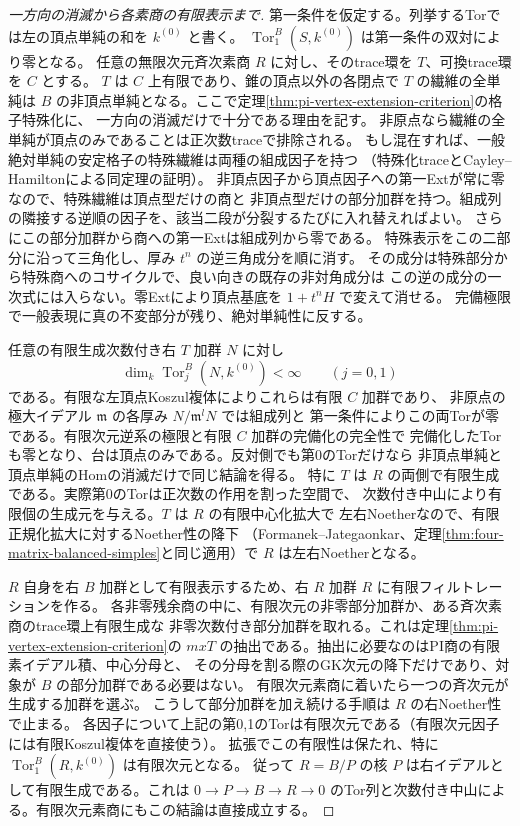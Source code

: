 \begin{proof}[一方向の消滅から各素商の有限表示まで]
第一条件を仮定する。列挙するTorでは左の頂点単純の和を $k^{(0)}$ と書く。
$\operatorname{Tor}_1^B(S,k^{(0)})$ は第一条件の双対により零となる。
任意の無限次元斉次素商 $R$ に対し、そのtrace環を $T$、可換trace環を $C$ とする。
$T$ は $C$ 上有限であり、錐の頂点以外の各閉点で $T$ の繊維の全単純は
$B$ の非頂点単純となる。ここで定理\ref{thm:pi-vertex-extension-criterion}の格子特殊化に、
一方向の消滅だけで十分である理由を記す。
非原点なら繊維の全単純が頂点のみであることは正次数traceで排除される。
もし混在すれば、一般絶対単純の安定格子の特殊繊維は両種の組成因子を持つ
（特殊化traceとCayley--Hamiltonによる同定理の証明）。
非頂点因子から頂点因子への第一Extが常に零なので、特殊繊維は頂点型だけの商と
非頂点型だけの部分加群を持つ。組成列の隣接する逆順の因子を、該当二段が分裂するたびに入れ替えればよい。
さらにこの部分加群から商への第一Extは組成列から零である。
特殊表示をこの二部分に沿って三角化し、厚み $t^n$ の逆三角成分を順に消す。
その成分は特殊部分から特殊商へのコサイクルで、良い向きの既存の非対角成分は
この逆の成分の一次式には入らない。零Extにより頂点基底を $1+t^n H$ で変えて消せる。
完備極限で一般表現に真の不変部分が残り、絶対単純性に反する。

任意の有限生成次数付き右 $T$ 加群 $N$ に対し
\[
   \dim_k\operatorname{Tor}_j^B(N,k^{(0)})<\infty\qquad (j=0,1)
\]
である。有限な左頂点Koszul複体によりこれらは有限 $C$ 加群であり、
非原点の極大イデアル $\mathfrak m$ の各厚み $N/\mathfrak m^l N$ では組成列と
第一条件によりこの両Torが零である。有限次元逆系の極限と有限 $C$ 加群の完備化の完全性で
完備化したTorも零となり、台は頂点のみである。反対側でも第0のTorだけなら
非頂点単純と頂点単純のHomの消滅だけで同じ結論を得る。
特に $T$ は $R$ の両側で有限生成である。実際第0のTorは正次数の作用を割った空間で、
次数付き中山により有限個の生成元を与える。$T$ は $R$ の有限中心化拡大で
左右Noetherなので、有限正規化拡大に対するNoether性の降下
（Formanek--Jategaonkar、定理\ref{thm:four-matrix-balanced-simples}と同じ適用）で
$R$ は左右Noetherとなる。

$R$ 自身を右 $B$ 加群として有限表示するため、右 $R$ 加群 $R$ に有限フィルトレーションを作る。
各非零残余商の中に、有限次元の非零部分加群か、ある斉次素商のtrace環上有限生成な
非零次数付き部分加群を取れる。これは定理\ref{thm:pi-vertex-extension-criterion}の
$mxT$ の抽出である。抽出に必要なのはPI商の有限素イデアル積、中心分母と、
その分母を割る際のGK次元の降下だけであり、対象が $B$ の部分加群である必要はない。
有限次元素商に着いたら一つの斉次元が生成する加群を選ぶ。
こうして部分加群を加え続ける手順は $R$ の右Noether性で止まる。
各因子について上記の第0,1のTorは有限次元である（有限次元因子には有限Koszul複体を直接使う）。
拡張でこの有限性は保たれ、特に $\operatorname{Tor}_1^B(R,k^{(0)})$ は有限次元となる。
従って $R=B/P$ の核 $P$ は右イデアルとして有限生成である。これは
$0\to P\to B\to R\to0$ のTor列と次数付き中山による。有限次元素商にもこの結論は直接成立する。
\end{proof}


